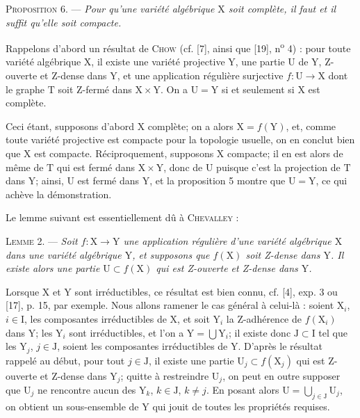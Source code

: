 
\textsc{Proposition} 6. — \textit{Pour qu'une variété algébrique $\mathrm{X}$ soit complète, il faut et il suffit qu'elle soit compacte.}

Rappelons d'abord un résultat de \textsc{Chow} (cf. [7], ainsi que [19], n\textsuperscript{o} 4) : pour toute variété algébrique $\mathrm{X}$, il existe une variété projective $\mathrm{Y}$, une partie $\mathrm{U}$ de $\mathrm{Y}$, Z-ouverte et Z-dense dans $\mathrm{Y}$, et une application régulière surjective $f : \mathrm{U} \to \mathrm{X}$ dont le graphe $\mathrm{T}$ soit Z-fermé dans $\mathrm{X} \times \mathrm{Y}$. On a $\mathrm{U} = \mathrm{Y}$ si et seulement si $\mathrm{X}$ est complète.

Ceci étant, supposons d'abord $\mathrm{X}$ complète; on a alors $\mathrm{X} = f(\mathrm{Y})$, et, comme toute variété projective est compacte pour la topologie usuelle, on en conclut bien que $\mathrm{X}$ est compacte. Réciproquement, supposons $\mathrm{X}$ compacte; il en est alors de même de $\mathrm{T}$ qui est fermé dans $\mathrm{X} \times \mathrm{Y}$, donc de $\mathrm{U}$ puisque c'est la projection de $\mathrm{T}$ dans $\mathrm{Y}$; ainsi, $\mathrm{U}$ est fermé dans $\mathrm{Y}$, et la proposition 5 montre que $\mathrm{U} = \mathrm{Y}$, ce qui achève la démonstration.

Le lemme suivant est essentiellement dû à \textsc{Chevalley} :

\textsc{Lemme} 2. — \textit{Soit $f : \mathrm{X} \to \mathrm{Y}$ une application régulière d'une variété algébrique $\mathrm{X}$ dans une variété algébrique $\mathrm{Y}$, et supposons que $f(\mathrm{X})$ soit Z-dense dans $\mathrm{Y}$. Il existe alors une partie $\mathrm{U} \subset f(\mathrm{X})$ qui est Z-ouverte et Z-dense dans $\mathrm{Y}$.}

Lorsque $\mathrm{X}$ et $\mathrm{Y}$ sont irréductibles, ce résultat est bien connu, cf. [4], exp. 3 ou [17], p. 15, par exemple. Nous allons ramener le cas général à celui-là : soient $\mathrm{X}_i$, $i \in \mathrm{I}$, les composantes irréductibles de $\mathrm{X}$, et soit $\mathrm{Y}_i$ la Z-adhérence de $f(\mathrm{X}_i)$ dans $\mathrm{Y}$; les $\mathrm{Y}_i$ sont irréductibles, et l'on a $\mathrm{Y} = \bigcup \mathrm{Y}_i$; il existe donc $\mathrm{J} \subset \mathrm{I}$ tel que les $\mathrm{Y}_j$, $j \in \mathrm{J}$, soient les composantes irréductibles de $\mathrm{Y}$. D'après le résultat rappelé au début, pour tout $j \in \mathrm{J}$, il existe une partie $\mathrm{U}_j \subset f(\mathrm{X}_j)$ qui est Z-ouverte et Z-dense dans $\mathrm{Y}_j$; quitte à restreindre $\mathrm{U}_j$, on peut en outre supposer que $\mathrm{U}_j$ ne rencontre aucun des $\mathrm{Y}_k$, $k \in \mathrm{J}$, $k \neq j$. En posant alors $\mathrm{U} = \bigcup\limits_{j \in \mathrm{J}} \mathrm{U}_j$, on obtient un sous-ensemble de $\mathrm{Y}$ qui jouit de toutes les propriétés requises.

